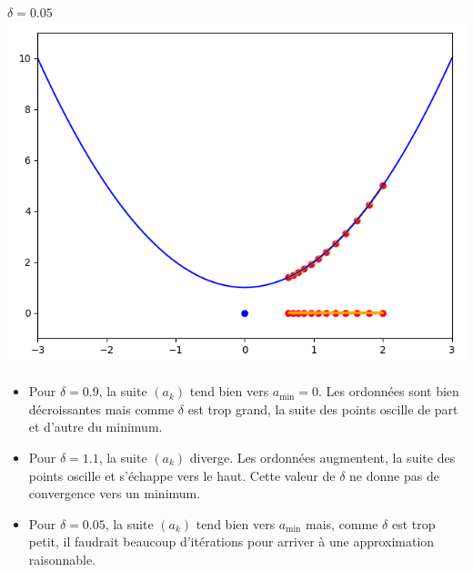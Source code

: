 \documentclass[10pt,class=report,crop=false]{standalone}
\begin{document}
\begin{exemple}
\begin{center}
\begin{minipage}{0.32\textwidth}
\begin{center}
\end{center}
\end{minipage}
\begin{minipage}{0.32\textwidth}
\begin{center}
$\delta=0.05$
\includegraphics[scale=\myscale,scale=0.3]{figures/descente_une_var_05}
\end{center}
\end{minipage}
\end{center}

\begin{itemize}
  \item Pour $\delta = 0.9$, la suite $(a_k)$ tend bien vers $a_{\min} = 0$. Les ordonnées sont bien décroissantes mais comme $\delta$ est trop grand, la suite des points oscille de part et d'autre du minimum.
  
  \item Pour $\delta = 1.1$, la suite $(a_k)$ diverge. Les ordonnées augmentent, la suite des points oscille et s'échappe vers le haut. Cette valeur de $\delta$ ne donne pas de convergence vers un minimum.
  
  \item Pour $\delta = 0.05$, la suite $(a_k)$ tend bien vers $a_{\min}$ mais, comme $\delta$ est trop petit, il faudrait beaucoup d'itérations pour arriver à une approximation raisonnable.
  
\end{itemize}
\end{exemple}
\end{document}
